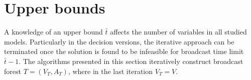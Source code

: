 \section{Upper bounds} \label{sec:ub}

A knowledge of an upper bound $\bar{t}$ affects the number of variables in all studied models. 
Particularly in the decision versions, the iterative approach can be terminated once the solution is found to be infeasible for broadcast time limit $\bar{t}-1$.
The algorithms presented in this section iteratively construct broadcast forest $T=(V_T,A_T)$, where in the last iteration $V_T=V$.
%
%
